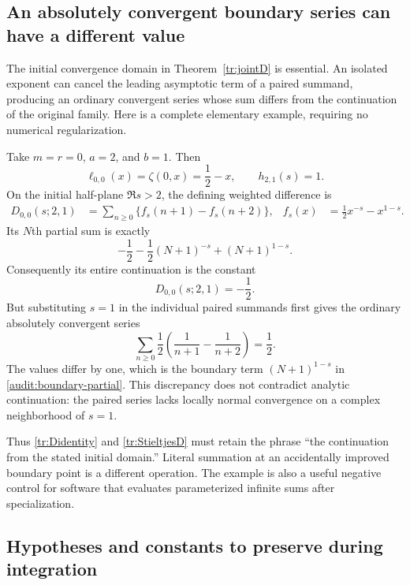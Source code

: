 \documentclass[11pt,letterpaper]{article}
\numberwithin{equation}{section}
\theoremstyle{plain}
\theoremstyle{definition}
\theoremstyle{remark}
\begin{document}
\subsection{An absolutely convergent boundary series can have a different value}
\label{audit:boundary}

The initial convergence domain in Theorem~\ref{tr:jointD} is essential.
An isolated exponent can cancel the leading asymptotic term of a
paired summand, producing an ordinary convergent series whose sum differs
from the continuation of the original family.  Here is a complete
elementary example, requiring no numerical regularization.

Take $m=r=0$, $a=2$, and $b=1$.  Then
\[
 \ell_{0,0}(x)=\zeta(0,x)=\frac12-x,
 \qquad h_{2,1}(s)=1.
\]
On the initial half-plane $\Re s>2$, the defining weighted difference
is
\begin{align}
 D_{0,0}(s;2,1)
 &=\sum_{n\geq0}\{f_s(n+1)-f_s(n+2)\},
 & f_s(x)&=\frac12x^{-s}-x^{1-s}.
 \label{audit:telescoping}
\end{align}
Its $N$th partial sum is exactly
\begin{equation}\label{audit:boundary-partial}
 -\frac12-\frac12(N+1)^{-s}+(N+1)^{1-s}.
\end{equation}
Consequently its entire continuation is the constant
\begin{equation}\label{audit:continued}
                         D_{0,0}(s;2,1)=-\frac12.
\end{equation}
But substituting $s=1$ in the individual paired summands first gives
the ordinary absolutely convergent series
\begin{equation}\label{audit:literal}
 \sum_{n\geq0}\frac12
       \left(\frac1{n+1}-\frac1{n+2}\right)=\frac12.
\end{equation}
The values differ by one, which is the boundary term
$(N+1)^{1-s}$ in \eqref{audit:boundary-partial}.  This discrepancy
does not contradict analytic continuation: the paired series lacks
locally normal convergence on a complex neighborhood of $s=1$.

Thus \eqref{tr:Didentity} and \eqref{tr:StieltjesD} must retain the
phrase ``the continuation from the stated initial domain.''  Literal
summation at an accidentally improved boundary point is a different
operation.  The example is also a useful negative control for software
that evaluates parameterized infinite sums after specialization.

\subsection{Hypotheses and constants to preserve during integration}
\end{document}
